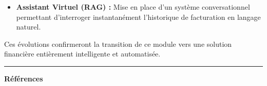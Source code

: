 \documentclass[12pt, a4paper, openany]{report}
\begin{document}
\begin{large}
\begin{itemize}
    \vspace{-0.5cm}
    \item \textcolor{primaryBlue}{\textbf{Assistant Virtuel (RAG) :}} Mise en place d'un système conversationnel permettant d'interroger instantanément l'historique de facturation en langage naturel.
\end{itemize}

\vspace{-0.4cm}
Ces évolutions confirmeront la transition de ce module vers une solution financière entièrement intelligente et automatisée.

\end{large}

\newpage
\thispagestyle{frontmatter}
{}

\vspace*{0.5cm}

\noindent
\textcolor{royalBlue}{\rule{0.60\textwidth}{1pt}}
\hfill
{\fontsize{24}{28}\selectfont\color{royalBlue}\bfseries Références}\par

\vspace{0.5cm}
\end{document}
